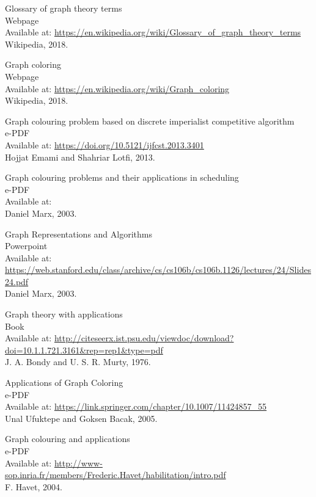 \documentclass[12pt, a4paper]{article}
\begin{document}
{\begin{thebibliography}{12}
 Glossary of graph theory terms\\
Webpage\\
Available at: \url{https://en.wikipedia.org/wiki/Glossary_of_graph_theory_terms}\\
Wikipedia, 2018.

 Graph coloring\\
Webpage\\
Available at: \url{https://en.wikipedia.org/wiki/Graph_coloring}\\
Wikipedia, 2018.

 Graph colouring problem based on discrete imperialist competitive algorithm\\
e-PDF\\
Available at: \url{https://doi.org/10.5121/ijfcst.2013.3401}\\
Hojjat Emami and Shahriar Lotfi, 2013.

 Graph colouring problems and their applications in scheduling\\
e-PDF\\
Available at: \url{}\\
Daniel Marx, 2003.

 Graph Representations and Algorithms\\
Powerpoint\\
Available at: \url{https://web.stanford.edu/class/archive/cs/cs106b/cs106b.1126/lectures/24/Slides24.pdf}\\
Daniel Marx, 2003.

 Graph theory with applications\\
Book\\
Available at: \url{http://citeseerx.ist.psu.edu/viewdoc/download?doi=10.1.1.721.3161&rep=rep1&type=pdf}\\
J. A. Bondy and U. S. R. Murty, 1976.

 Applications of Graph Coloring\\
e-PDF\\
Available at: \url{https://link.springer.com/chapter/10.1007/11424857_55}\\
Unal Ufuktepe and Goksen Bacak, 2005.

 Graph colouring and applications\\
e-PDF\\
Available at: \url{http://www-sop.inria.fr/members/Frederic.Havet/habilitation/intro.pdf}\\
F. Havet, 2004.


\end{thebibliography}}
\end{document}
